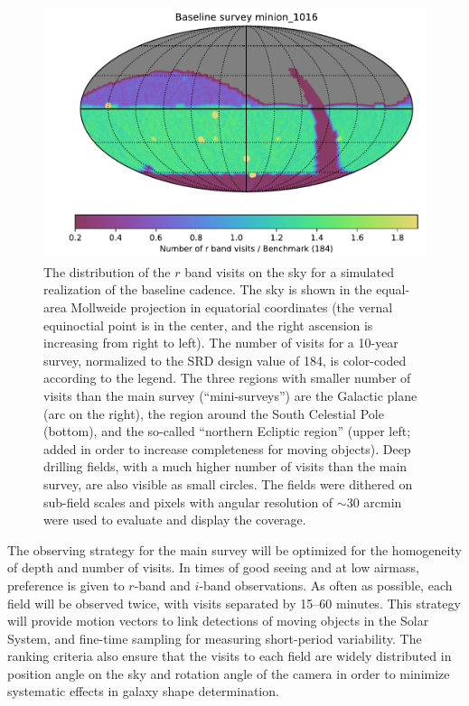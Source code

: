 \begin{figure}
\includegraphics[width=1.0\hsize,clip]{nvisit_minion1016}
\vskip -0.01in
\caption{The distribution of the $r$ band visits on the sky for a simulated
realization of the baseline cadence. The sky is shown in the equal-area Mollweide
projection in equatorial coordinates (the vernal equinoctial point is in the center, and
the right ascension is increasing from right to left). The number of visits for
a 10-year survey, normalized to the SRD design value of 184, is color-coded according
to the legend. The three regions with smaller number of visits than the main survey
(``mini-surveys'') are the Galactic plane (arc on the right), the region around the
South Celestial Pole (bottom), and the so-called ``northern Ecliptic region'' (upper left;
added in order to increase completeness for moving objects). Deep drilling fields, with
a much higher number of visits than the main survey, are also visible as small circles.
The fields were dithered on sub-field scales and pixels with angular resolution of
$\sim$30 arcmin were used to evaluate and display the coverage.}
\label{Fig:rbandSky}
\end{figure}

The observing strategy for the main survey will be optimized for the homogeneity
of depth and number of visits. In times of good seeing and at low airmass, preference
is given to $r$-band and $i$-band observations. As often as possible, each field will be
observed twice, with visits separated by 15--60 minutes. This strategy will provide motion
vectors to link detections of moving objects in the Solar System, and fine-time sampling
for measuring short-period variability. The ranking criteria also ensure that the
visits to each field are widely distributed in position angle on the sky and
rotation angle of the camera in order to minimize systematic effects in galaxy shape
determination.

